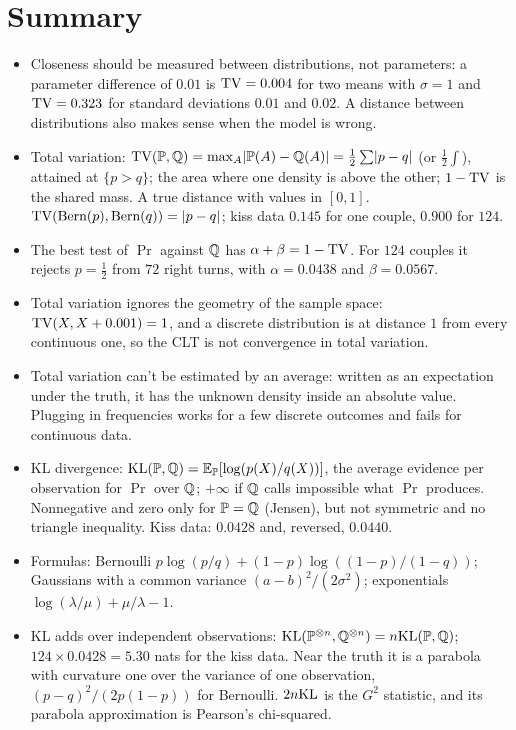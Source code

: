 \section{Summary}
\label{sec:dist-summary}

\begin{itemize}[nosep]
\item Closeness should be measured between distributions, not parameters: a parameter difference of $0.01$ is $\mathrm{TV} = 0.004$ for two means with $\sigma = 1$ and $\mathrm{TV} = 0.323$ for standard deviations $0.01$ and $0.02$. A distance between distributions also makes sense when the model is wrong.
\item Total variation: $\mathrm{TV}(\mathbb{P}, \mathbb{Q}) = \max_A \lvert\mathbb{P}(A) - \mathbb{Q}(A)\rvert = \frac12 \sum \lvert p - q\rvert$ (or $\frac12\int$), attained at $\{p > q\}$; the area where one density is above the other; $1 - \mathrm{TV}$ is the shared mass. A true distance with values in $[0, 1]$. $\mathrm{TV}(\text{Bern}(p), \text{Bern}(q)) = \lvert p - q\rvert$; kiss data $0.145$ for one couple, $0.900$ for $124$.
\item The best test of $\Pr$ against $\mathbb{Q}$ has $\alpha + \beta = 1 - \mathrm{TV}$. For $124$ couples it rejects $p = \frac12$ from $72$ right turns, with $\alpha = 0.0438$ and $\beta = 0.0567$.
\item Total variation ignores the geometry of the sample space: $\mathrm{TV}(X, X + 0.001) = 1$, and a discrete distribution is at distance $1$ from every continuous one, so the CLT is not convergence in total variation.
\item Total variation can't be estimated by an average: written as an expectation under the truth, it has the unknown density inside an absolute value. Plugging in frequencies works for a few discrete outcomes and fails for continuous data.
\item KL divergence: $\mathrm{KL}(\mathbb{P}, \mathbb{Q}) = \operatorname*{\mathbb{E}}_{\mathbb{P}}[\log(p(X)/q(X))]$, the average evidence per observation for $\Pr$ over $\mathbb{Q}$; $+\infty$ if $\mathbb{Q}$ calls impossible what $\Pr$ produces. Nonnegative and zero only for $\mathbb{P} = \mathbb{Q}$ (Jensen), but not symmetric and no triangle inequality. Kiss data: $0.0428$ and, reversed, $0.0440$.
\item Formulas: Bernoulli $p\log(p/q) + (1-p)\log((1-p)/(1-q))$; Gaussians with a common variance $(a - b)^2/(2\sigma^2)$; exponentials $\log(\lambda/\mu) + \mu/\lambda - 1$.
\item KL adds over independent observations: $\mathrm{KL}(\mathbb{P}^{\otimes n}, \mathbb{Q}^{\otimes n}) = n \mathrm{KL}(\mathbb{P}, \mathbb{Q})$; $124 \times 0.0428 = 5.30$ nats for the kiss data. Near the truth it is a parabola with curvature one over the variance of one observation, $(p - q)^2/(2p(1-p))$ for Bernoulli. $2n\mathrm{KL}$ is the $G^2$ statistic, and its parabola approximation is Pearson's chi-squared.

\end{itemize}
